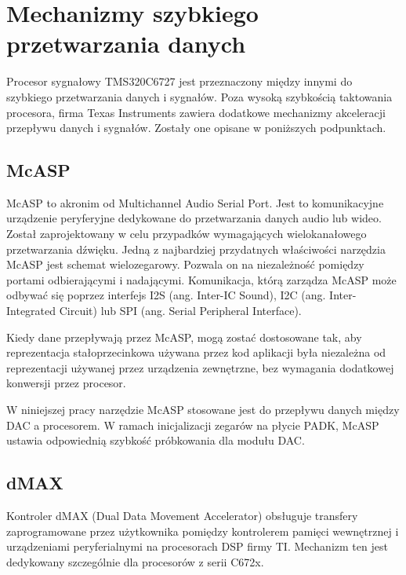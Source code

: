 \section{Mechanizmy szybkiego przetwarzania danych}
Procesor sygnałowy TMS320C6727 jest przeznaczony między innymi do szybkiego przetwarzania danych i sygnałów. Poza wysoką szybkością taktowania procesora, firma Texas Instruments zawiera dodatkowe mechanizmy akceleracji przepływu danych i sygnałów. Zostały one opisane w poniższych podpunktach.

\subsection{McASP}
McASP to akronim od Multichannel Audio Serial Port. Jest to komunikacyjne urządzenie peryferyjne dedykowane do przetwarzania danych audio lub wideo. Został zaprojektowany w celu przypadków wymagających wielokanałowego przetwarzania dźwięku. Jedną z najbardziej przydatnych właściwości narzędzia McASP jest schemat wielozegarowy. Pozwala on na niezależność pomiędzy portami odbierającymi i nadającymi. Komunikacja, którą zarządza McASP może odbywać się poprzez interfejs I2S (ang. Inter-IC Sound), I2C (ang. Inter-Integrated Circuit) lub SPI (ang. Serial Peripheral Interface).

Kiedy dane przepływają przez McASP, mogą zostać dostosowane tak, aby reprezentacja stałoprzecinkowa używana przez kod aplikacji była niezależna od reprezentacji używanej przez urządzenia zewnętrzne, bez wymagania dodatkowej konwersji przez procesor.

W niniejszej pracy narzędzie McASP stosowane jest do przepływu danych między DAC a procesorem. W ramach inicjalizacji zegarów na płycie PADK, McASP ustawia odpowiednią szybkość próbkowania dla modułu DAC.

\subsection{dMAX}
Kontroler dMAX (Dual Data Movement Accelerator) obsługuje transfery zaprogramowane przez użytkownika pomiędzy kontrolerem pamięci wewnętrznej i urządzeniami peryferialnymi na procesorach DSP firmy TI. Mechanizm ten jest dedykowany szczególnie dla procesorów z serii C672x.

